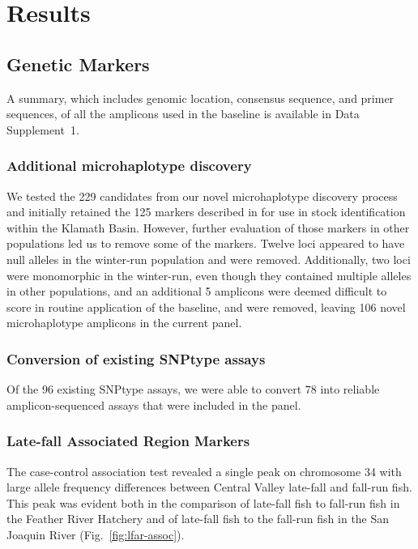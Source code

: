 \section*{Results}

\subsection*{Genetic Markers}

A summary, which includes genomic location, consensus sequence, and primer sequences,
of all the amplicons used in the baseline is available
in Data Supplement~1.

\subsubsection*{Additional microhaplotype discovery}

We tested the 229 candidates from our novel microhaplotype discovery process and
initially retained the 125 markers described in \citep{thompson2020complex}
for use in stock identification within
the Klamath Basin.  However, further evaluation of those markers in other
populations led us to remove some of the markers.
Twelve loci appeared to have null alleles in the winter-run population and were removed.
Additionally, two loci were monomorphic in the winter-run, even though they contained
multiple alleles in other populations, and an additional 5 amplicons were deemed
difficult to score in routine application of the baseline, and were removed, leaving 106
novel microhaplotype amplicons in the current panel.


\subsubsection*{Conversion of existing SNPtype assays}

Of the 96 existing SNPtype assays, we were able to convert 78
into reliable amplicon-sequenced assays that were included in the panel.



\subsubsection*{Late-fall Associated Region Markers}

The case-control association test revealed a single peak on chromosome 34 with large allele frequency differences
between Central Valley late-fall and fall-run fish.  This peak was evident both in the comparison of
late-fall fish to fall-run fish in the Feather River Hatchery and of late-fall fish to the fall-run fish in
the San Joaquin River (Fig.~\ref{fig:lfar-assoc}).




